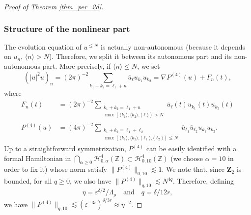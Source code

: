 \documentclass[11pt]{article}
\theoremstyle{definition}
\begin{document}
\begin{proof}[Proof of Theorem \ref{thm_per_2d}]
\subsubsection*{Structure of the nonlinear part}
The evolution equation of $u^{\leq N}$ is actually non-autonomous (because it depends on $u_n$, $\langle n \rangle >N$). Therefore, we split it between its autonomous part and its non-autonomous part. More precisely, if $\langle n \rangle \leq N$, we set
\[
(|u|^2 u)_n = (2\pi)^{-2} \sum_{k_1+k_2=\ell_1+n} \overline{u}_{\ell} u_{k_1} u_{k_2} = \nabla P^{(4)}(u)+F_n(t),
\]
where
\begin{align*}
F_n(t) &= (2\pi)^{-2} \! \! \! \! \! \sum_{\substack{
k_1+k_2=\ell_1+n\\
\max(\langle k_1 \rangle, \langle k_2 \rangle,\langle \ell \rangle)>N}} \! \! \! \! \! \overline{u}_{\ell}(t) u_{k_1}(t) u_{k_2}(t)
\\
\tag*{and}
P^{(4)}(u) &= (4\pi)^{-2} \! \! \! \! \! \! \! \! \! \sum_{ \substack{k_1+k_2=\ell_1+\ell_2\\ \max(\langle k_1 \rangle, \langle k_2 \rangle,\langle \ell_1 \rangle,\langle \ell_2 \rangle)\leq N } } \! \! \! \! \! \overline{u}_{\ell_1} \overline{u}_{\ell_2} u_{k_1} u_{k_2}.
\end{align*}
Up to a straightforward symmetrization, $P^{(4)}$ can be easily identified with a formal Hamiltonian in $\bigcap_{\alpha\geq 0}\mathscr{H}_{0,\alpha}^{4}(\mathbb{Z}) \subset \mathscr{H}_{0,10}^{4}(\mathbb{Z}) $ (we choose $\alpha=10$ in order to fix it) whose norm satisfy $\|P^{(4)} \|_{0,10} \lesssim 1$. We note that, since $\mathbf{Z}_2$ is bounded, for all $q\geq 0$, we also have $\|P^{(4)} \|_{q,10} \lesssim N^{4q}$. Therefore, defining
\[
\eta = \varepsilon^{\delta/2}/\Lambda_\rho \quad \text{and} \quad q=\delta/12r,
\]
we have $\|P^{(4)} \|_{q,10} \lesssim (\varepsilon^{-3r})^{\delta/3r}\approx \eta^{-2}$.


\end{proof}
\end{document}
